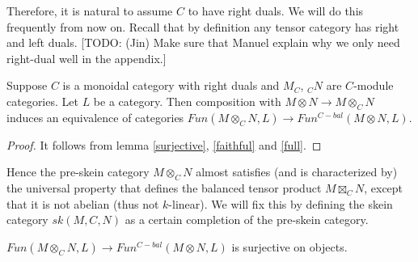 \noindent Therefore, it is natural to assume $C$ to have right duals.
We will do this frequently from now on. Recall that by definition any tensor
category has right and left duals. [TODO: (Jin) Make sure that Manuel explain
why we only need right-dual well in the appendix.]

\begin{proposition}\label{univ_bal}
  Suppose $C$ is a monoidal category with right duals and $M_C$, $_{C}N$ are
  $C$-module categories. Let $L$ be a category. Then composition with
  $M\otimes N \to M\otimes_C N$ induces an equivalence of categories
  $Fun(M\otimes_C N,L)\to Fun^{C-bal}(M\otimes N,L)$.
\end{proposition}

\begin{proof}
  It follows from lemma \ref{surjective}, \ref{faithful} and \ref{full}.
\end{proof}

\begin{remark}
  Hence the pre-skein category $M \otimes_{C} N$ almost satisfies (and is characterized by) the
  universal property that defines the balanced tensor product $M \boxtimes_{C}
  N$, except that it is not abelian (thus not $k$-linear). We will fix this by
  defining the skein category $sk(M,C,N)$ as a certain completion of the
  pre-skein category.
\end{remark}

\begin{lemma}\label{surjective}
  $Fun(M\otimes_C N,L)\to Fun^{C-bal}(M\otimes N,L)$ is surjective on
  objects.
\end{lemma}

